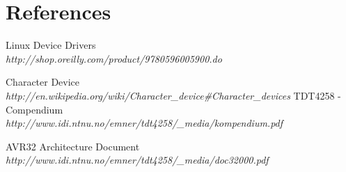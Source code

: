 \section{References}

\begin{enumerate}
	 Linux Device Drivers\\
		\emph{http://shop.oreilly.com/product/9780596005900.do}

	 Character Device
		\emph{http://en.wikipedia.org/wiki/Character\_device\#Character\_devices}
	 TDT4258 - Compendium\\
		\emph{http://www.idi.ntnu.no/emner/tdt4258/\_media/kompendium.pdf}

	 AVR32 Architecture Document\\
		\emph{http://www.idi.ntnu.no/emner/tdt4258/\_media/doc32000.pdf}

\end{enumerate}

